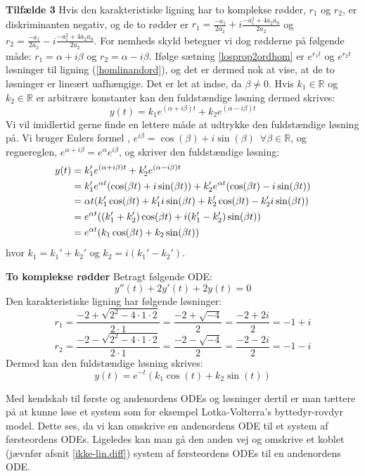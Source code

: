 \hfill \break
\textbf{Tilfælde 3}\hfill \break
Hvis den karakteristiske ligning har to komplekse rødder, $r_1$ og $r_2$, er diskriminanten negativ, og de to rødder er $r_1=\frac{-a_1}{2a_2}+i\frac{-a_1^2+4a_2a_0}{2a_2}$ og $r_2=\frac{-a_1}{2a_2}-i\frac{-a_1^2+4a_2a_0}{2a_2}$. For nemheds skyld betegner vi dog rødderne på følgende måde: $r_1=\alpha+i\beta$ og $r_2=\alpha-i\beta$. Ifølge sætning \ref{losprop2ordhom} er $e^{r_1t}$ og $e^{r_2t}$ løsninger til ligning (\ref{homlinandord}), og det er dermed nok at vise, at de to løsninger er lineært uafhængige. Det er let at indse, da $\beta \neq 0$. Hvis $k_1\in \mathbb{R}$ og $k_2 \in \mathbb{R}$ er arbitrære konstanter kan den fuldstændige løsning dermed skrives:\hfill \break
$$y(t)=k_1e^{(\alpha+i\beta)t}+k_2e^{(\alpha-i\beta)t}$$ \hfill \break
Vi vil imidlertid gerne finde en lettere måde at udtrykke den fuldstændige løsning på. Vi bruger Eulers formel \citep[s. 27]{JAB}, $e^{i\beta}=\cos(\beta)+i\sin(\beta) \enspace \forall \beta \in \mathbb{R}$, og regnereglen, $e^{\alpha+i\beta}=e^{\alpha}e^{i\beta}$, og skriver den fuldstændige løsning:\hfill \break
\begin{align}
y(t)&=k_1'e^{(\alpha+i\beta)t}+k_2'e^{(\alpha-i\beta)t} \notag \\
&=k_1'e^{\alpha t}(\cos(\beta t)+i\sin(\beta t))+k_2'e^{\alpha t}(\cos(\beta t)-i\sin(\beta t)) \notag \\
&={\alpha t}(k_1'\cos(\beta t)+k_1'i\sin(\beta t)+k_2'\cos(\beta t)-k_2'i\sin(\beta t)) \notag \\
&=e^{\alpha t}((k_1'+k_2')\cos(\beta t)+i(k_1'-k_2')\sin(\beta t)) \notag \\
&=e^{\alpha t}(k_1\cos(\beta t)+k_2\sin(\beta t)) 
\end{align}
hvor $k_1=k_1'+k_2'$ og $k_2=i(k_1'-k_2')$.\hfill \break
\begin{Example}\textbf{To komplekse rødder} \hfill \break
\textnormal{Betragt følgende ODE:}\hfill \break
$$y''(t)+2y'(t)+2y(t)=0$$\hfill \break
\textnormal{Den karakteristiske ligning har følgende løsninger:} \hfill \break
$$r_1=\frac{-2+\sqrt{2^2-4\cdot 1\cdot 2}}{2\cdot 1}=\frac{-2+\sqrt{-4}}{2}=\frac{-2+2i}{2}=-1+i$$
$$r_2=\frac{-2-\sqrt{2^2-4\cdot 1\cdot 2}}{2\cdot 1}=\frac{-2-\sqrt{-4}}{2}=\frac{-2-2i}{2}=-1-i$$\hfill \break
\textnormal{Dermed kan den fuldstændige løsning skrives:}\hfill \break
$$y(t)=e^{-t}(k_1\cos(t)+k_2\sin(t))$$
\end{Example}



Med kendskab til første og andenordens ODEs og løsninger dertil er man tættere på at kunne løse et system som for eksempel Lotka-Volterra's byttedyr-rovdyr model. Dette ses, da vi kan omskrive en andenordens ODE til et system af førsteordens ODEs. Ligeledes kan man gå den anden vej og omskrive et koblet (jævnfør afsnit \ref{ikke-lin.diff}) system af førsteordens ODEs til en andenordens ODE.

